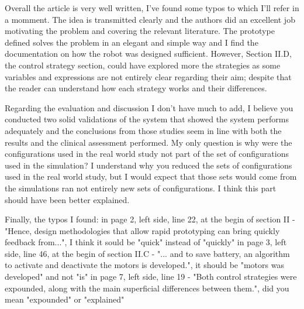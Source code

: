 \documentclass[journal,onecolumn,12pt]{IEEEtran}
\begin{document}
\vspace{2em}

Overall the article is very well written, I've found some typos to which I'll refer in a momment. The idea is transmitted clearly and the authors did an excellent job motivating the problem and covering the relevant literature. The prototype defined solves the problem in an elegant and simple way and I find the documentation on how the robot was designed sufficient. However, Section II.D, the control strategy section, could have explored more the strategies as some variables and expressions are not entirely clear regarding their aim; despite that the reader can understand how each strategy works and their differences.

\vspace{2em}

Regarding the evaluation and discussion I don't have much to add, I believe you conducted two solid validations of the system that showed the system performs adequately and the conclusions from those studies seem in line with both the results and the clinical assessment performed. My only question is why were the configurations used in the real world study not part of the set of configurations used in the simulation? I understand why you reduced the sets of configurations used in the real world study, but I would expect that those sets would come from the simulations ran not entirely new sets of configurations. I think this part should have been better explained.

\vspace{2em}

Finally, the typos I found:
      in page 2, left side, line 22, at the begin of section II - "Hence, design methodologies that allow rapid prototyping can bring quickly feedback from...", I think it sould be "quick" instead of "quickly"
      in page 3, left side, line 46, at the begin of section II.C - "... and to save battery,
an algorithm to activate and deactivate the motors is developed.", it should be "motors was developed" and not "is"
      in page 7, left side, line 19 - "Both control strategies were expounded, along with the main superficial differences between them.", did you mean "expounded" or "explained"

\vspace{2em}

\section*{}
\end{document}
